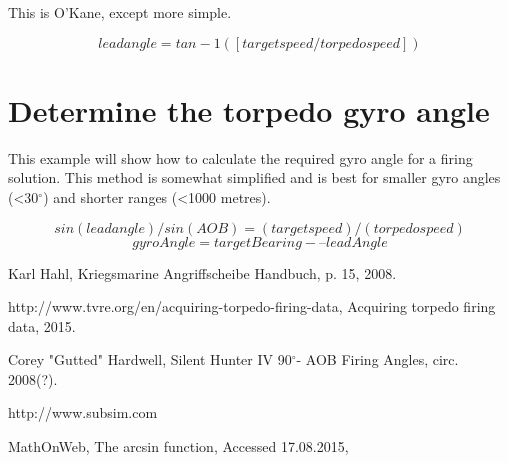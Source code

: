 \documentclass{article}
\newcommand{\degree}{$^{\circ}$}
\begin{document}
This is O'Kane, except more simple.

$$ lead angle = tan-1 ( [target speed / torpedo speed] ) $$


\section{Determine the torpedo gyro angle}
This example will show how to calculate the required gyro angle for a firing solution. This method is somewhat simplified and is best for smaller gyro angles (\textless 30\degree) and shorter ranges (\textless 1000 metres).

$$sin (lead angle) / sin (AOB) = (target speed) / (torpedo speed)$$
$$ gyroAngle = targetBearing -– leadAngle $$


\pagebreak
\begin{thebibliography}{9}

  Karl Hahl,
  Kriegsmarine Angriffscheibe Handbuch,
  p. 15,
  2008.
  
http://www.tvre.org/en/acquiring-torpedo-firing-data,
Acquiring torpedo firing data,
2015.

Corey "Gutted" Hardwell,
Silent Hunter IV 90\degree - AOB Firing Angles,
circ. 2008(?).

http://www.subsim.com

MathOnWeb,
The arcsin function,
Accessed 17.08.2015,


\end{thebibliography}
\end{document}
